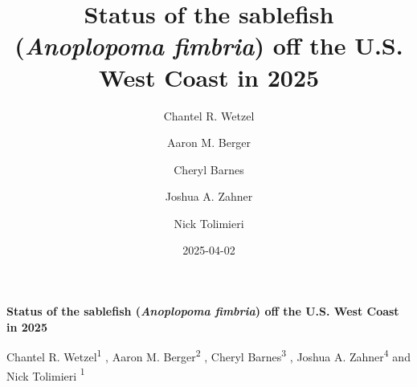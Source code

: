 \documentclass[
]{scrartcl}
\title{Status of the sablefish (\emph{Anoplopoma fimbria}) off the U.S.
West Coast in 2025}
\author{Chantel R. Wetzel \and Aaron M. Berger \and Cheryl
Barnes \and Joshua A. Zahner \and Nick Tolimieri}
\date{2025-04-02}
\begin{document}
  \begin{titlepage}

  \begin{minipage}[b][\textheight][s]{\textwidth}


  \raggedright




  {\huge\bfseries\nohyphens{Status of the sablefish (\emph{Anoplopoma
  fimbria}) off the U.S. West Coast in 2025}}\\[1\baselineskip]



  \vspace{1\baselineskip}


  \vspace{1\baselineskip}

   {\large{Chantel R. Wetzel}}{\textsuperscript{1}}%
  ,
   {\large{Aaron M. Berger}}{\textsuperscript{2}}%
  ,
   {\large{Cheryl Barnes}}{\textsuperscript{3}}%
  ,
   {\large{Joshua A. Zahner}}{\textsuperscript{4}}%
  { and \large{Nick Tolimieri}}%
  {\textsuperscript{1}}%



  \vspace{2\baselineskip}


\end{minipage}
\end{titlepage}
\end{document}

